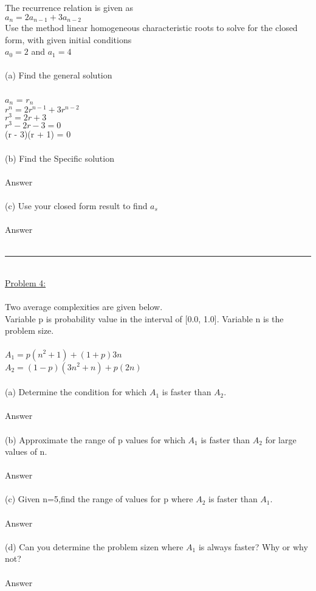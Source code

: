 \documentclass{article}
\begin{document}
    The recurrence relation is given as \\
    \indent $a_n = 2a_{n-1} + 3a_{n-2}$\\
    Use the method linear homogeneous characteristic roots to solve for the closed form, with given initial conditions\\
    \indent $a_0 = 2$ and $a_1 = 4$\\
    \\
    (a) Find the general solution\\
    \\
    \indent $a_n$ = $r_n$\\
    \indent $r^n = 2r^{n-1} + 3r^{n-2}$\\
    \indent $r^3 = 2r + 3$\\
    \indent $r^3 - 2r - 3 = 0$\\
    \indent (r - 3)(r + 1) = 0\\
    \\
    (b) Find the Specific solution\\
    \\
    \indent Answer\\
    \\
    (c) Use your closed form result to find $a_s$\\
    \\
    \indent Answer\\
    \\
    \rule{\textwidth}{0.5pt}\\
    \underline{Problem 4:}\\\\
    Two average complexities are given below.\\Variable p is probability value in the interval of [0.0, 1.0]. Variable n is the problem size. \\
    \\
    $A_1 = p(n^2 + 1) + (1 + p)3n$\\
    $A_2 = (1 - p) (3n^2 + n) + p(2n)$\\
    \\
    (a) Determine the condition for which $A_1$ is faster than $A_2$.\\
    \\
    \indent Answer\\
    \\
    (b) Approximate the range of p values for which $A_1$ is faster than $A_2$ for large values of n.\\
    \\
    \indent Answer\\
    \\
    (c) Given n=5,find the range of values for p where $A_2$ is faster than $A_1$.\\
    \\
    \indent Answer\\
    \\
    (d) Can you determine the problem sizen where $A_1$ is always faster? Why or why not?\\
    \\
    \indent Answer\\
    \\
\end{document}
